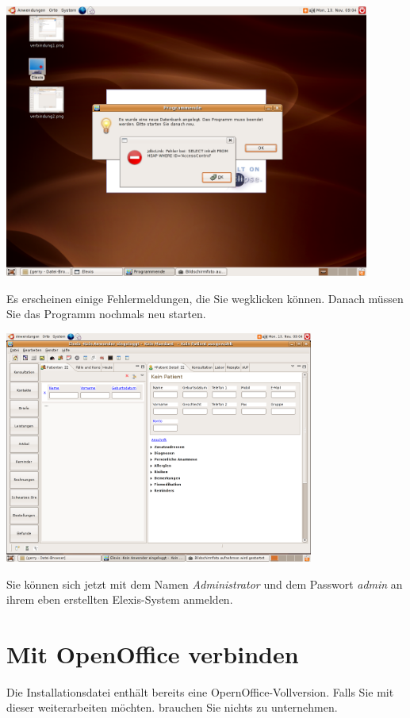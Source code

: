 \includegraphics[width=0.9\textwidth]{images/verbindung13.png}

 Es erscheinen einige Fehlermeldungen, die Sie wegklicken können. Danach müssen Sie das Programm nochmals neu starten.

\includegraphics[width=4in]{images/verbindung14.png}

Sie können sich jetzt mit dem Namen \textit{Administrator} und dem Passwort \textit{admin} an ihrem eben erstellten Elexis-System anmelden.

\section{Mit OpenOffice verbinden}
\label{config:ooo}
Die Installationsdatei enthält bereits eine OpernOffice-Vollversion. Falls Sie mit dieser weiterarbeiten möchten. brauchen Sie nichts zu unternehmen. 

